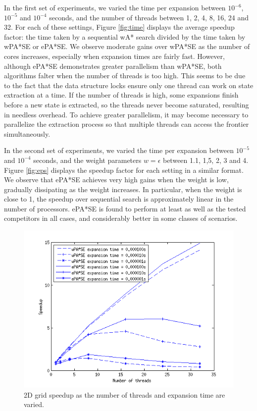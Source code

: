 \documentclass[letterpaper]{article}
\begin{document}
In the first set of experiments, we varied the time per expansion between $10^{-6}$, $10^{-5}$ and $10^{-4}$ seconds, and the number of threads between 1, 2, 4, 8, 16, 24 and 32. For each of these settings, Figure \ref{fig:time} displays the average speedup factor: the time taken by a sequential wA* search divided by the time taken by wPA*SE or ePA*SE. We observe moderate gains over wPA*SE as the number of cores increases, especially when expansion times are fairly fast. However, although ePA*SE demonstrates greater parallelism than wPA*SE, both algorithms falter when the number of threads is too high. This seems to be due to the fact that the data structure locks ensure only one thread can work on state extraction at a time. If the number of threads is high, some expansions finish before a new state is extracted, so the threads never become saturated, resulting in needless overhead. To achieve greater parallelism, it may become necessary to parallelize the extraction process so that multiple threads can access the frontier simultaneously.

In the second set of experiments, we varied the time per expansion between $10^{-5}$ and $10^{-4}$ seconds, and the weight parameters $w=\epsilon$ between 1.1, 1,5, 2, 3 and 4. Figure \ref{fig:eps} displays the speedup factor for each setting in a similar format. We observe that ePA*SE achieves very high gains when the weight is low, gradually dissipating as the weight increases. In particular, when the weight is close to 1, the speedup over sequential search is approximately linear in the number of processors. ePA*SE is found to perform at least as well as the tested competitors in all cases, and considerably better in some classes of scenarios.

\begin{figure}[fig:time]
\centering\includegraphics[scale=0.55]{time_sweep_para.png}
\caption{2D grid speedup as the number of threads and expansion time are varied.}
\end{figure}
\end{document}
